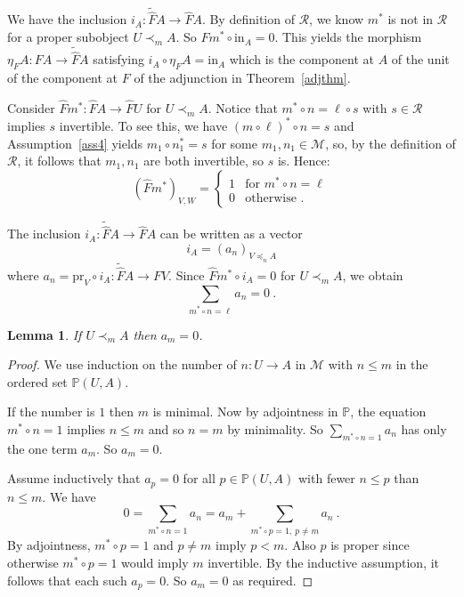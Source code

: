 \documentclass[a4paper,12pt,reqno]{amsart}
\newtheorem{lemma}[theorem]{Lemma}
\theoremstyle{definition}
\theoremstyle{fact}
\theoremstyle{genquest}
\theoremstyle{step}
\newcommand{\lra}{\longrightarrow}
\newcommand{\ra}{\rightarrow}
\def\CM{{\mathscr M}}
\def\CR{{\mathscr R}}
\begin{document}
We have the inclusion $i_A : \widetilde{\widehat{F}}A \lra \widehat{F}A$.
By definition of $\CR$, we know $m^*$ is not in $\CR$ for 
a proper subobject $U\prec_mA$. 
So $\widehat{F}m^*\circ \mathrm{in}_A = 0$. 
This yields the morphism
$\eta_FA : FA \lra \widetilde{\widehat{F}}A$ 
satisfying $i_A \circ \eta_FA = \mathrm{in}_A$ which is the component at 
$A$ of the unit of the component at $F$ of the adjunction in Theorem~\ref{adjthm}. 

Consider $\widehat{F}m^*: \widehat{F}A\lra \widehat{F}U$ for $U\prec_m A$.
Notice that $m^*\circ n = \ell \circ s$ with $s\in \CR$ implies $s$ invertible. 
To see this, we have $(m\circ \ell)^*\circ n = s$ and Assumption~\ref{ass4} yields
$m_1\circ n_1^*= s$ for some $m_1,n_1\in \CM$, so, by the definition of $\CR$,
it follows that $m_1, n_1$ are both invertible, so $s$ is. Hence:
\begin{equation*}
(\widehat{F}m^*)_{V,W} =
\begin{cases}
1 & \text{for }  m^*\circ n = \ell \\
0 & \text{otherwise } .
\end{cases}
\end{equation*}

The inclusion $i_A : \widetilde{\widehat{F}}A \lra \widehat{F}A$ can be written 
as a vector
$$i_A = (a_n)_{V\preceq_nA}$$
where $a_n = \mathrm{pr}_V \circ i_A : \widetilde{\widehat{F}}A \lra FV$. 
Since $\widehat{F}m^*\circ i_A = 0$ for $U\prec_m A$, we obtain
$$\sum_{m^*\circ n=\ell}{a_n} = 0 \ .$$ 

\begin{lemma}\label{am=0} 
If $U\prec_m A$ then $a_m = 0$.
\end{lemma} 
\begin{proof}
We use induction on the number of $n : U\ra A$ in $\CM$ with $n\le m$ in the
ordered set $\mathbb{P}(U,A)$. 

If the number is $1$ then $m$ is minimal. Now by adjointness in $\mathbb{P}$, the equation $m^*\circ n =1$ implies $n\le m$ and so $n=m$ by minimality. So
$\sum_{m^*\circ n=1}a_n$ has only the one term $a_m$. So $a_m=0$.

Assume inductively that $a_p = 0$ for all $p\in \mathbb{P}(U,A)$ with fewer $n\le p$ than $n\le m$. 
We have $$0 = \sum_{m^*\circ n=1}a_n = a_m + \sum_{m^*\circ p =1, \ p\neq m}a_n \ .$$
By adjointness, $m^*\circ p =1$ and $p\neq m$ imply $p< m$.
Also $p$ is proper since otherwise $m^*\circ p =1$ would imply $m$ invertible.  
By the inductive assumption, it follows that each such $a_p = 0$.
So $a_m=0$ as required.  
\end{proof}
\end{document}
